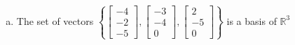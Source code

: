 \begin{exerciseAnswer}
\begin{enumerate}[(a)]
\item The set of vectors \( \left\{ \left[\begin{array}{c}
-4 \\
-2 \\
-5
\end{array}\right] , \left[\begin{array}{c}
-3 \\
-4 \\
0
\end{array}\right] , \left[\begin{array}{c}
2 \\
-5 \\
0
\end{array}\right] \right\} \) is a basis of \(\mathbb{R}^3\)
\end{enumerate}
    
\end{exerciseAnswer}
    
